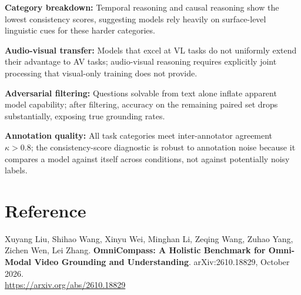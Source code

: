 \documentclass[10pt,twocolumn]{article}
\begin{document}
\textbf{Category breakdown:} Temporal reasoning and causal reasoning show
the lowest consistency scores, suggesting models rely heavily on
surface-level linguistic cues for these harder categories.

\textbf{Audio-visual transfer:} Models that excel at VL tasks do not
uniformly extend their advantage to AV tasks; audio-visual reasoning
requires explicitly joint processing that visual-only training does not
provide.

\textbf{Adversarial filtering:} Questions solvable from text alone
inflate apparent model capability; after filtering, accuracy on the
remaining paired set drops substantially, exposing true grounding rates.

\textbf{Annotation quality:} All task categories meet inter-annotator
agreement $\kappa > 0.8$; the consistency-score diagnostic is robust to
annotation noise because it compares a model against itself across
conditions, not against potentially noisy labels.

\section*{Reference}

Xuyang Liu, Shihao Wang, Xinyu Wei, Minghan Li, Zeqing Wang, Zuhao Yang,
Zichen Wen, Lei Zhang.
\textbf{OmniCompass: A Holistic Benchmark for Omni-Modal Video Grounding
and Understanding}.
arXiv:2610.18829, October 2026.\\
\url{https://arxiv.org/abs/2610.18829}
\end{document}
